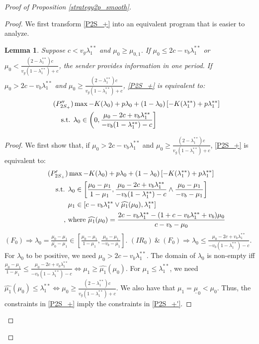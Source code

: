 \documentclass[11pt]{extarticle}
\newtheorem{lemma}{Lemma}
\newcommand{\lra}{\Leftrightarrow}
\newcommand{\ra}{\Rightarrow}
\newcommand{\m}{\wedge}
\newcommand{\M}{\vee}
\begin{document}
\begin{proof}[Proof of Proposition \ref{strategy2p_smooth}]
\begin{enumerate}
		\begin{proof}
			We first transform \eqref{P2S_+} into an equivalent program that is easier to analyze.
			\begin{lemma}\label{trans2S_+}
				Suppose $c < v_g\lambda_1^{**}$ and $ \mu_0 \geq \mu_{0,1}$. If $\mu_0 \leq 2c-v_b\lambda_1^{**}$ or $\mu_0 < \frac{(2-\lambda_1^{**})c}{v_g(1-\lambda_1^{**})+c}$, the sender provides information in one period. If $\mu_0 > 2c-v_b\lambda_1^{**}$ and $\mu_0 \geq \frac{(2-\lambda_1^{**})c}{v_g(1-\lambda_1^{**})+c}$, \eqref{P2S_+} is equivalent to:
				\begin{align}\tag{$P''_{2S_+}$} \label{P2S_+''}
				& \max -K(\lambda_0) + p \lambda_0 + (1-\lambda_0) \left[-K(\lambda_1^{**})+p \lambda_1^{**}\right] \nonumber\\
				\text{s.t. } &\lambda_0 \in \left(0, \frac{\mu_0-2c +v_b \lambda_1^{**}}{-v_b(1-\lambda_1^{**})-c}\right] \nonumber
				\end{align}
			\end{lemma}
			\begin{proof}
				We first show that, if $\mu_0 > 2c-v_b\lambda_1^{**}$ and $\mu_0 \geq \frac{(2-\lambda_1^{**})c}{v_g(1-\lambda_1^{**})+c}$, \eqref{P2S_+} is equivalent to:
				\vspace{-20pt}
				\begin{align}\tag{$P'_{2S_+}$} \label{P2S_+'}
				& \max -K(\lambda_0) + p \lambda_0 + (1-\lambda_0) \left[-K(\lambda_1^{**})+p \lambda_1^{**}\right] \nonumber\\
				\text{s.t. } &\lambda_0 \in \left[\frac{\mu_0-\mu_1}{1-\mu_1}, \frac{\mu_0-2c +v_b \lambda_1^{**}}{-v_b(1-\lambda_1^{**})-c} \m \frac{\mu_0-\mu_1}{-v_b-\mu_1}\right] \nonumber\\
				&\mu_1\in [c - v_b \lambda_1^{**} \M \widehat{\mu_1}(\mu_0), \lambda_1^{**}] \nonumber\\
				,~&\text{where } \widehat{\mu_1}(\mu_0) = \frac{2c-v_b\lambda_1^{**}-(1+c-v_b\lambda_1^{**}+v_b)\mu_0}{c-v_b-\mu_0} \nonumber
				\end{align}
				$(F_0) \ra \lambda_0 = \frac{\mu_0-\mu_1}{\bar{\mu_0}-\mu_1} \in \left[\frac{\mu_0-\mu_1}{1-\mu_1}, \frac{\mu_0-\mu_1}{-v_b-\mu_1}\right]$. $(IR_0)~\&~(F_0) \ra \lambda_0 \leq \frac{\mu_0-2c +v_b \lambda_1^{**}}{-v_b(1-\lambda_1^{**})-c}$. For $\lambda_0$ to be positive, we need $\mu_0 > 2c-v_b \lambda_1^{**}$. The domain of $\lambda_0$ is non-empty iff $\frac{\mu_0-\mu_1}{1-\mu_1}\leq \frac{\mu_0-2c +v_b \lambda_1^{**}}{-v_b(1-\lambda_1^{**})-c} \Leftrightarrow \mu_1 \geq \widehat{\mu_1}(\mu_0)$. For $\mu_1 \leq \lambda_1^{**}$, we need $\widehat{\mu_1}(\mu_0) \leq \lambda_1^{**} \lra \mu_0 \geq \frac{(2-\lambda_1^{**})c}{v_g(1-\lambda_1^{**})+c}$. We also have that $\mu_1 = \underline{\mu}_0 < \mu_0.$ Thus, the constraints in \eqref{P2S_+} imply the constraints in \eqref{P2S_+'}.
				

\end{proof}
\end{proof}
\end{enumerate}
\end{proof}
\end{document}
